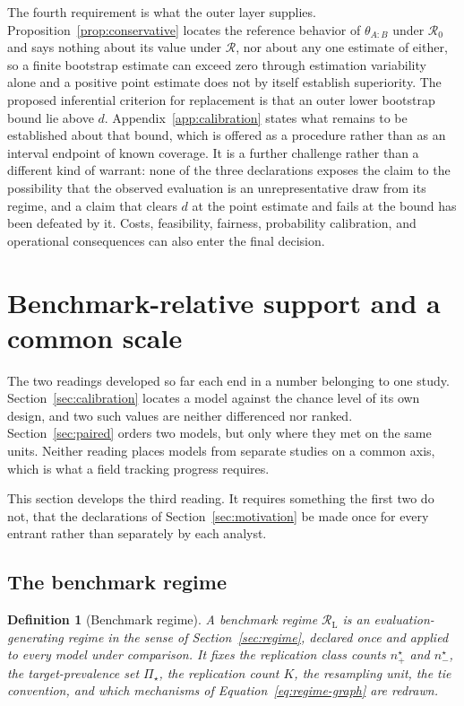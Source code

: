 \documentclass[11pt]{article}
\newcommand{\Regime}{\mathcal{R}}
\newcommand{\PSet}{\Pi_\star}
\newcommand{\RegimeL}{\Regime_{\mathrm{L}}}
\newtheorem{definition}{Definition}
\theoremstyle{remark}
\begin{document}
The fourth requirement is what the outer layer supplies. Proposition~\ref{prop:conservative} locates the reference behavior of $\theta_{A:B}$ under $\Regime_0$ and says nothing about its value under $\Regime$, nor about any one estimate of either, so a finite bootstrap estimate can exceed zero through estimation variability alone and a positive point estimate does not by itself establish superiority. The proposed inferential criterion for replacement is that an outer lower bootstrap bound lie above $d$. Appendix~\ref{app:calibration} states what remains to be established about that bound, which is offered as a procedure rather than as an interval endpoint of known coverage. It is a further challenge rather than a different kind of warrant: none of the three declarations exposes the claim to the possibility that the observed evaluation is an unrepresentative draw from its regime, and a claim that clears $d$ at the point estimate and fails at the bound has been defeated by it. Costs, feasibility, fairness, probability calibration, and operational consequences can also enter the final decision.


\section{Benchmark-relative support and a common scale}
\label{sec:leaderboard}

The two readings developed so far each end in a number belonging to one study. Section~\ref{sec:calibration} locates a model against the chance level of its own design, and two such values are neither differenced nor ranked. Section~\ref{sec:paired} orders two models, but only where they met on the same units. Neither reading places models from separate studies on a common axis, which is what a field tracking progress requires.

This section develops the third reading. It requires something the first two do not, that the declarations of Section~\ref{sec:motivation} be made once for every entrant rather than separately by each analyst.

\subsection{The benchmark regime}
\label{sec:benchmark-regime}

\begin{definition}[Benchmark regime]
\label{def:benchmark-regime}
A benchmark regime $\RegimeL$ is an evaluation-generating regime in the sense of Section~\ref{sec:regime}, declared once and applied to every model under comparison. It fixes the replication class counts $n^\star_+$ and $n^\star_-$, the target-prevalence set $\PSet$, the replication count $K$, the resampling unit, the tie convention, and which mechanisms of Equation~\eqref{eq:regime-graph} are redrawn.
\end{definition}
\end{document}
